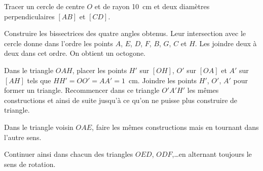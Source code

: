 Tracer un cercle de centre $O$ et de rayon 10~cm et deux diamètres perpendiculaires $[AB]$ et $[CD]$.
\par Construire les bissectrices des quatre angles obtenus. Leur intersection avec le cercle donne dans l'ordre les points $A$, $E$, $D$, $F$, $B$, $G$, $C$ et $H$. Les joindre deux à deux dans cet ordre. On obtient un octogone.
\par Dans le triangle $OAH$, placer les points $H'$ sur $[OH]$, $O'$ sur $[OA]$ et $A'$ sur $[AH]$ tels que $HH'=OO'=AA'=1$~cm. Joindre les points $H'$, $O'$, $A'$ pour former un triangle. Recommencer dans ce triangle $O'A'H'$ les mêmes constructions et ainsi de suite jusqu'à ce qu'on ne puisse plus construire de triangle.
\par Dans le triangle voisin $OAE$, faire les mêmes constructions mais en tournant dans l'autre sens.
\par Continuer ainsi dans chacun des triangles $OED$, $ODF$,\ldots en alternant toujours le sens de rotation.